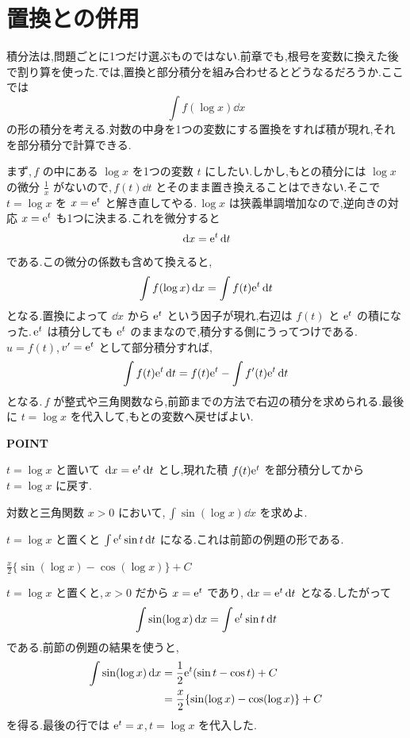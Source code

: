 \section{置換との併用}\label{節:置換と部分積分}

積分法は,問題ごとに1つだけ選ぶものではない.前章でも,根号を変数に換えた後で割り算を使った.では,置換と部分積分を組み合わせるとどうなるだろうか.ここでは
\[
 \int f(\log x)\dd x
\]
の形の積分を考える.対数の中身を1つの変数にする置換をすれば積が現れ,それを部分積分で計算できる.

まず,\,$f$ の中にある $\log x$ を1つの変数 $t$ にしたい.しかし,もとの積分には $\log x$ の微分 $\frac1x$ がないので,\,$f(t)\dd t$ とそのまま置き換えることはできない.そこで $t=\log x$ を $x=\mathrm{e}^t$ と解き直してやる.\,$\log x$ は狭義単調増加なので,逆向きの対応 $x=\mathrm{e}^t$ も1つに決まる.これを微分すると
\[
 \,\mathrm{d} x=\mathrm{e}^t\,\mathrm{d} t
\]
である.この微分の係数も含めて換えると,
\[
 \int f(\log x)\,\mathrm{d} x=\int f(t)\mathrm{e}^t\,\mathrm{d} t
\]
となる.置換によって $\dd x$ から $\mathrm{e}^t$ という因子が現れ,右辺は $f(t)$ と $\mathrm{e}^t$ の積になった.\,$\mathrm{e}^t$ は積分しても $\mathrm{e}^t$ のままなので,積分する側にうってつけである.\,$u=f(t)$,\,$v'=\mathrm{e}^t$ として部分積分すれば,
\[
 \int f(t)\mathrm{e}^t\,\mathrm{d} t
 =f(t)\mathrm{e}^t-\int f'(t)\mathrm{e}^t\,\mathrm{d} t
\]
となる.\,$f$ が整式や三角関数なら,前節までの方法で右辺の積分を求められる.最後に $t=\log x$ を代入して,もとの変数へ戻せばよい.

\begin{bookpoint}
\textbf{POINT}\par
$t=\log x$ と置いて $\,\mathrm{d} x=\mathrm{e}^t\,\mathrm{d} t$ とし,現れた積 $f(t)\mathrm{e}^t$ を部分積分してから $t=\log x$ に戻す.
\end{bookpoint}

\begin{example}{対数と三角関数}
$x>0$ において,\,$\int\sin(\log x)\dd x$ を求めよ.
\end{example}

$t=\log x$ と置くと $\int\mathrm{e}^t\sin t\,\mathrm{d} t$ になる.これは前節の例題の形である.

$\frac x2\{\sin(\log x)-\cos(\log x)\}+C$

$t=\log x$ と置くと,\,$x>0$ だから $x=\mathrm{e}^t$ であり,\,$\,\mathrm{d} x=\mathrm{e}^t\,\mathrm{d} t$ となる.したがって
\[
 \int\sin(\log x)\,\mathrm{d} x
 =\int\mathrm{e}^t\sin t\,\mathrm{d} t
\]
である.前節の例題の結果を使うと,
\[
\begin{aligned}
 \int\sin(\log x)\,\mathrm{d} x
 &=\frac12\mathrm{e}^t(\sin t-\cos t)+C\\
 &=\frac x2\{\sin(\log x)-\cos(\log x)\}+C
\end{aligned}
\]
を得る.最後の行では $\mathrm{e}^t=x$,\,$t=\log x$ を代入した.

